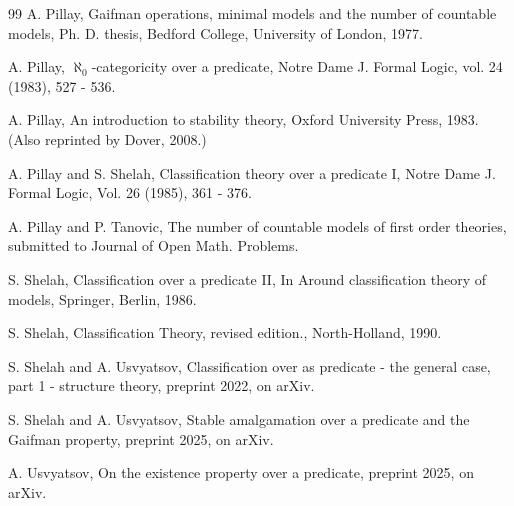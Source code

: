 \documentclass[12pt]{article}
\begin{document}
\begin{thebibliography}{99}
 A. Pillay, Gaifman operations, minimal models and the number of countable models, Ph. D. thesis, Bedford College, University of London, 1977.

 A. Pillay, $\aleph_{0}$-categoricity over a predicate, Notre Dame J. Formal Logic, vol. 24 (1983), 527 - 536. 

  A. Pillay, An introduction to stability theory, Oxford University Press, 1983. (Also reprinted by Dover, 2008.) 

  A. Pillay and S. Shelah, Classification theory over a predicate I, Notre Dame J. Formal Logic, Vol. 26 (1985), 361 - 376. 

   A. Pillay and P. Tanovic,  The number of countable models of first order theories, submitted to Journal of Open Math. Problems. 

 S. Shelah,  Classification over a predicate II, In Around classification theory of models, Springer, Berlin, 1986. 

 S. Shelah,  Classification Theory, revised edition.,  North-Holland, 1990. 

 S. Shelah and A. Usvyatsov,  Classification over as predicate - the general case, part 1 - structure theory, preprint 2022, on arXiv. 

 S. Shelah and A. Usvyatsov,  Stable amalgamation over a predicate and the Gaifman property, preprint 2025, on arXiv.

  A. Usvyatsov,  On the existence property over a predicate, preprint 2025, on arXiv.



\end{thebibliography}
\end{document}
